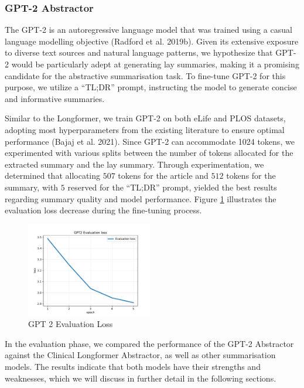 \documentclass[
]{article}
\begin{document}
\hypertarget{sec:gpt2-abstractor}{%
\subsubsection{GPT-2 Abstractor}\label{sec:gpt2-abstractor}}

The GPT-2 is an autoregressive language model that was trained using a
casual language modelling objective (Radford et al. 2019b). Given its
extensive exposure to diverse text sources and natural language
patterns, we hypothesize that GPT-2 would be particularly adept at
generating lay summaries, making it a promising candidate for the
abstractive summarisation task. To fine-tune GPT-2 for this purpose, we
utilize a ``TL;DR'' prompt, instructing the model to generate concise
and informative summaries.

Similar to the Longformer, we train GPT-2 on both eLife and PLOS
datasets, adopting most hyperparameters from the existing literature to
ensure optimal performance (Bajaj et al. 2021). Since GPT-2 can
accommodate 1024 tokens, we experimented with various splits between the
number of tokens allocated for the extracted summary and the lay
summary. Through experimentation, we determined that allocating \(507\)
tokens for the article and \(512\) tokens for the summary, with \(5\)
reserved for the ``TL;DR'' prompt, yielded the best results regarding
summary quality and model performance. Figure \ref{fig:gpt-eval}
illustrates the evaluation loss decrease during the fine-tuning process.

\begin{figure}
    \centering
    \includegraphics[width=0.49\textwidth]{charts/gpt_eval_loss}
    \caption{GPT 2 Evaluation Loss}\label{fig:gpt-eval}
\end{figure}

In the evaluation phase, we compared the performance of the GPT-2
Abstractor against the Clinical Longformer Abstractor, as well as other
summarisation models. The results indicate that both models have their
strengths and weaknesses, which we will discuss in further detail in the
following sections.
\end{document}
